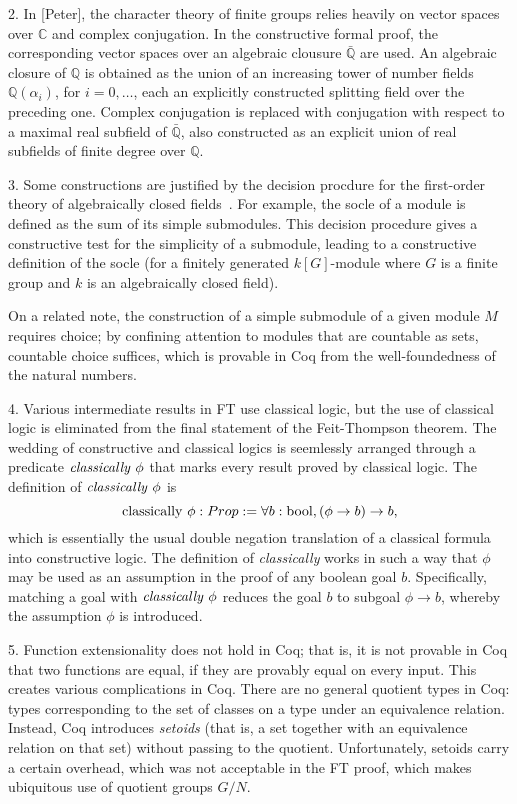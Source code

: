 \documentclass[brochure,english,12pt]{bourbaki}
\theoremstyle{plain}
\def\op#1{{\operatorname{#1}}}
\def\ring#1{{\mathbb{#1}}}
\begin{document}
2. In [Peter], the character theory of finite groups relies heavily on 
vector spaces over $\ring{C}$ and complex conjugation.  In the constructive formal proof, the corresponding
vector spaces over an algebraic clousure $\bar{\ring{Q}}$ are used.  An algebraic closure of $\ring{Q}$ 
is obtained as the union of an increasing tower of  
number fields $\ring{Q}(\alpha_i)$, for $i=0,\ldots$, each  an explicitly constructed splitting field
over the preceding one.
Complex conjugation is replaced with
conjugation with respect to a maximal real subfield of $\bar{\ring{Q}}$, also constructed
as an explicit union of real subfields of finite degree over $\ring{Q}$.

3.  Some constructions are justified by the decision procdure for the first-order theory
of algebraically closed fields~\cite{XX}.  
For example, the socle of a module is defined as the sum of its
simple submodules.  This decision procedure gives a constructive test for the simplicity of a submodule,
leading to a constructive definition of the socle  (for a finitely generated 
$k[G]$-module where $G$ is a finite group and $k$ is an algebraically closed field).  

On a related note, the construction of a simple submodule of a given module $M$ requires choice;
by confining attention to modules that are countable as sets, countable choice suffices, which 
is provable in Coq from the well-foundedness of the natural numbers.


4.  Various intermediate results in FT use classical logic, but the use of classical
logic is eliminated from the final statement of the Feit-Thompson theorem.  The wedding of constructive and
classical logics is 
seemlessly arranged
through a predicate $\op{\it classically}~\phi$ that marks every result proved by classical logic.
The definition of $\op{\it classically}~\phi$ is
\[
\op{classically}~\phi : Prop := \forall {b:\bool}, (\phi\to b) \to b,
\]
which is essentially the usual double negation translation of a classical formula into
constructive logic.  The definition of {\it classically} works in such a way that $\phi$ may
be used as an assumption in the proof of any boolean goal $b$.  Specifically, matching a goal
with $\op{\it classically}~\phi$ reduces the goal $b$ to subgoal $\phi\to b$, whereby the assumption
$\phi$ is introduced.

5.  Function extensionality does not hold in Coq; that is, it is not provable in Coq
that two functions are equal, if they are provably equal on every input.  This creates various
complications in Coq.  There are no general quotient types in Coq: types corresponding
to the set of classes on a type under an equivalence relation.  Instead, Coq introduces {\it setoids} 
(that is, a set together 
with an equivalence relation on that set) without passing to the quotient.  Unfortunately, setoids carry a certain
overhead, which was not acceptable in the FT proof, which makes ubiquitous use of quotient
groups $G/N$.   
\end{document}
